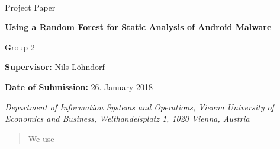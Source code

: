 \documentclass[a4paper, 12pt, twppages]{article}
\begin{document}
\pagebreak

\thispagestyle{fancy}


{\vspace{2cm}~}
{\vspace{2cm}}

{\noindent\large Project Paper}
\vspace{1cm}

{\noindent\huge\textbf{Using a Random Forest for Static Analysis of Android Malware}}

\bigskip

{\noindent\LARGE Group 2}


\bigskip
{\vspace{2cm}}
{\noindent\large {\bf Supervisor:} Nils Löhndorf}

\bigskip

{\noindent\large {\bf Date of Submission:} 26. January 2018}

\bigskip\bigskip\bigskip\bigskip\bigskip\bigskip

{\em\noindent Department of Information Systems and Operations, Vienna University of
Economics and Business, Welthandelsplatz 1, 1020 Vienna, Austria
}


\pagestyle{empty}
\pagebreak
\tableofcontents
\pagebreak
\listoffigures
\pagebreak
\listoftables
\pagebreak


\begin{abstract}
We use \cite{drebin}
\end{abstract}

\pagebreak







\end{document}
